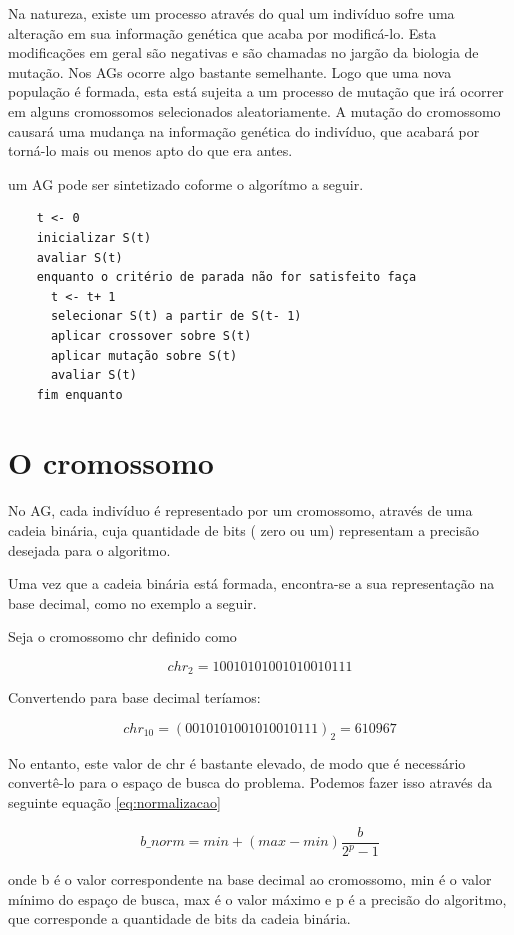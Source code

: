 \documentclass[
    12pt,               %
    oneside,%
    a4paper,            %
    english,            %
    french,             %
    spanish,            %
    brazil,             %
    ]{abntex2}
\begin{document}
  Na natureza, existe um processo através do qual um indivíduo sofre uma alteração em sua informação genética que acaba por modificá-lo. Esta modificações em geral são negativas e são chamadas no jargão da biologia de mutação. Nos AGs ocorre algo bastante semelhante. Logo que uma nova população é formada, esta está sujeita a um processo de mutação que irá ocorrer em alguns cromossomos selecionados aleatoriamente. A mutação do cromossomo causará uma mudança na informação genética do indivíduo, que acabará por torná-lo mais ou menos apto do que era antes.

  um AG pode ser sintetizado coforme o algorítmo a seguir.

  \begin{verbatim}
    t <- 0
    inicializar S(t)
    avaliar S(t)
    enquanto o critério de parada não for satisfeito faça
      t <- t+ 1
      selecionar S(t) a partir de S(t- 1)
      aplicar crossover sobre S(t)
      aplicar mutação sobre S(t)
      avaliar S(t)
    fim enquanto
  \end{verbatim}

\section{O cromossomo}

  No AG, cada indivíduo é representado por um cromossomo, através de uma cadeia binária, cuja quantidade de bits ( zero ou um) representam a precisão desejada para o algoritmo.

  Uma vez que a cadeia binária está formada, encontra-se a sua representação na base decimal, como no exemplo a seguir.

  Seja o cromossomo chr definido como

  $$chr_2 = 10010101001010010111$$

  Convertendo para base decimal teríamos:

  $$chr_{10} = (0010101001010010111)_2 = 610967$$

  No entanto, este valor de chr é bastante elevado, de modo que é necessário convertê-lo para o espaço de busca do problema. Podemos fazer isso através da seguinte equação \ref{eq:normalizacao}

  \begin{equation}
    b\_norm = min + (max - min) \frac{b}{2^p -1}
    \label{eq:normalizacao}
  \end{equation}
  

  onde b é o valor correspondente na base decimal ao cromossomo, min é o valor mínimo do espaço de busca, max é o valor máximo e p é a precisão do algoritmo, que corresponde a quantidade de bits da cadeia binária.
\end{document}
